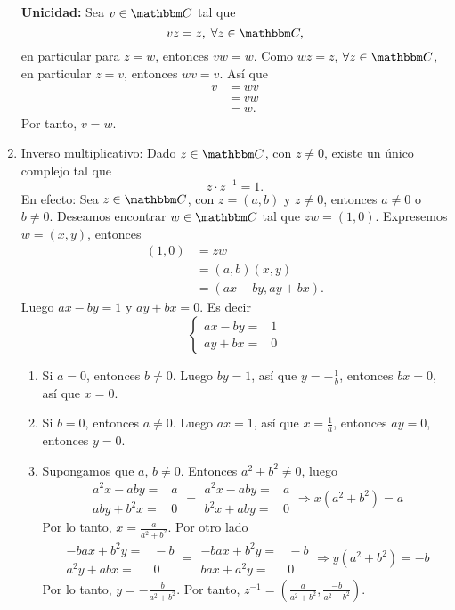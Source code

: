 \begin{enumerate}[resume,label=A\arabic*.]
    \textbf{Unicidad:} Sea $v \in \CC$ tal que
    $$vz=z, \; \forall z \in \CC,$$
    en particular para $z=w$, entonces $vw=w$. Como $wz=z$, $\forall z \in \CC$, en particular $z=v$, entonces $wv=v$. Así que
    \begin{align*}
        v & = wv \\
        & = vw \\
        & = w.
    \end{align*}
    Por tanto, $v=w$.
    \item Inverso multiplicativo: Dado $z \in \CC$, con $z \neq 0$, existe un único complejo tal que
    $$z \cdot z^{-1}=1.$$
    En efecto: Sea $z \in \CC$, con $z=(a,  b)$ y $z \neq 0$, entonces $a \neq 0$ o $b \neq 0$. Deseamos encontrar $w \in \CC$ tal que $zw=(1,  0)$. Expresemos $w=(x,  y)$, entonces
    \begin{align*}
        (1,  0) &=zw \\
        &=(a,  b)(x,  y) \\
        &=(ax-by,  ay+bx).
    \end{align*}
    Luego $ax-by=1$ y $ay+bx=0$. Es decir
    $$\left\{ \begin{array}{rl}
        ax-by= & \!\!\!\! 1 \\
        ay+bx= & \!\!\!\! 0
    \end{array}\right.$$
    \begin{enumerate}[label=\roman*.]
        \item Si $a=0$, entonces $b \neq 0$. Luego $by=1$, así que $\displaystyle y=-\frac{1}{b}$, entonces $bx=0$, así que $x=0$.
        \item Si $b=0$, entonces $a \neq 0$. Luego $ax=1$, así que $\displaystyle x=\frac{1}{a}$, entonces $ay=0$, entonces $y=0$.
        \item Supongamos que $a$, $b \neq 0$. Entonces $a^2+b^2 \neq 0$, luego
        $$\begin{array}{rl}
            a^2x-aby= & \!\!\!\! a \\
            aby+b^2x= & \!\!\!\! 0
        \end{array} = \begin{array}{rl}
            a^2x-aby= & \!\!\!\! a \\
            b^2x+aby= & \!\!\!\! 0
        \end{array} \Longrightarrow x \left(a^2+b^2 \right)= a$$
        Por lo tanto, $\displaystyle x=\frac{a}{a^2+b^2}$. Por otro lado
        $$\begin{array}{rl}
            -bax+b^2y= & \!\!\!\! -b \\
            a^2y+abx= & \!\!\!\! 0
        \end{array} =
        \begin{array}{rl}
            -bax+b^2y= & \!\!\!\! -b \\
            bax+a^2y= & \!\!\!\! 0
        \end{array} \Longrightarrow y \left( a^2+b^2 \right)=-b$$
        Por lo tanto, $\displaystyle y=-\frac{b}{a^2+b^2}$. Por tanto, $\displaystyle z^{-1}=\left( \frac{a}{a^2+b^2},  \frac{-b}{a^2+b^2} \right)$.
    \end{enumerate}
\end{enumerate}\newpage
